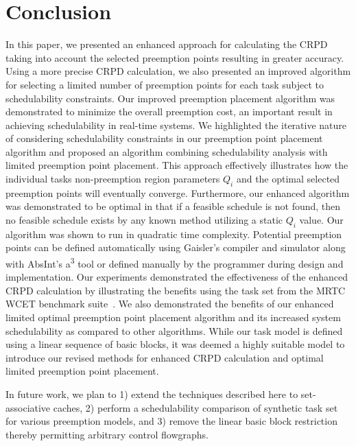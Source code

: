 \vspace{-18pt}
\section{Conclusion}\label{sec:conclusion}
In this paper, we presented an enhanced approach for calculating the
CRPD taking into account the selected preemption points resulting
in greater accuracy.  Using a more precise CRPD calculation, we also
presented an improved algorithm for selecting a limited number of
preemption points for each task subject to schedulability constraints.
Our improved preemption placement algorithm was demonstrated to
minimize the overall preemption cost, an important result in achieving
schedulability in real-time systems.  We highlighted the iterative nature
of considering schedulability constraints in our preemption point
placement algorithm and proposed an algorithm combining schedulability
analysis with limited preemption point placement.  This approach
effectively illustrates how the individual tasks non-preemption
region parameters $Q_i$ and the optimal selected preemption points will
eventually converge.  Furthermore, our enhanced algorithm was demonstrated to be
optimal in that if a feasible schedule is not found, then no feasible
schedule exists by any known method utilizing a static $Q_i$ value.  Our algorithm
was shown to run in quadratic time complexity.  Potential preemption points can be
defined automatically using Gaisler's compiler and simulator along with AbsInt's
a\textsuperscript{3} tool or defined manually by the programmer during design
and implementation. Our experiments demonstrated the effectiveness of
the enhanced CRPD calculation by illustrating the benefits using the
task set from the MRTC WCET benchmark suite~\cite{mrtc:01}.
We also demonstrated the benefits of our enhanced limited optimal preemption
point placement algorithm and its increased system schedulability as
compared to other algorithms.  While our task model is defined using a linear
sequence of basic blocks, it was deemed a highly suitable model to introduce
our revised methods for enhanced CRPD calculation and optimal limited
preemption point placement.  
%

In future work, we plan to 1) extend the techniques described here to set-associative caches,
2) perform a schedulability comparison of synthetic task set for various preemption models, and
3) remove the linear basic block restriction thereby permitting arbitrary control flowgraphs.
